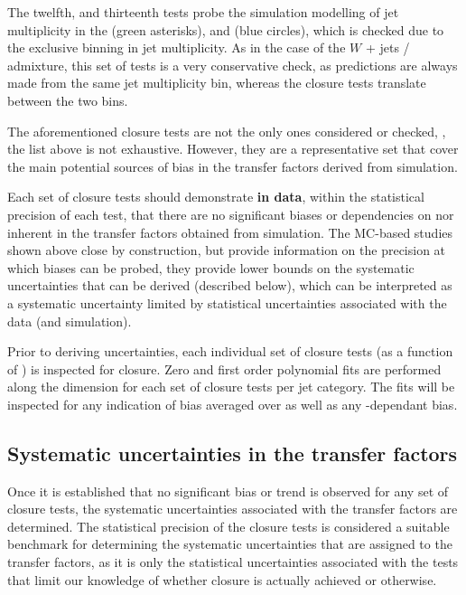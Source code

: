 The twelfth, and thirteenth tests probe the simulation modelling of
jet multiplicity in the \ej (green asterisks), and \eej (blue circles),
which is checked due to the exclusive binning in jet multiplicity.  As
in the case of the $W$ + jets / \ttbar admixture, this set of tests is a
very conservative check, as predictions are always made from the same
jet multiplicity bin, whereas the closure tests translate between the
two bins.

The aforementioned closure tests are not the only ones considered or
checked, \ie, the list above is not exhaustive. However, they are a
representative set that cover the main potential sources of bias in
the transfer factors derived from simulation. 

Each set of closure tests should demonstrate {\bf in data}, within the
statistical precision of each test, that there are no significant
biases or dependencies on \njet nor \scalht inherent in the transfer
factors obtained from simulation. The MC-based studies shown above
close by construction, but provide information on the precision at
which biases can be probed, \ie they provide lower bounds on the
systematic uncertainties that can be derived (described below), which
can be interpreted as a systematic uncertainty limited by statistical
uncertainties associated with the data (and simulation).

Prior to deriving uncertainties, each individual set of closure tests
(as a function of \scalht) is inspected for closure. Zero and first order
polynomial fits are performed along the \scalht dimension for each set
of closure tests per jet category. The fits will be inspected for any
indication of bias averaged over \scalht as well as any
\scalht-dependant bias.

\subsection{Systematic uncertainties in the transfer factors\label{sec:syst-from-closure}}

Once it is established that no significant bias or trend is observed
for any set of closure tests, the systematic uncertainties associated
with the transfer factors are determined. The statistical precision of
the closure tests is considered a suitable benchmark for determining
the systematic uncertainties that are assigned to the transfer
factors, as it is only the statistical uncertainties associated with
the tests that limit our knowledge of whether closure is actually
achieved or otherwise.

